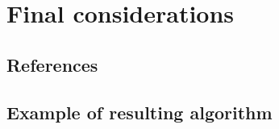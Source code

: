 \documentclass{ufscThesis}
\begin{document}
\chapter{Final considerations}\label{cap:final}


\section{References}




\appendix

\section{Example of resulting algorithm}
\label{appendix:example}
\end{document}
